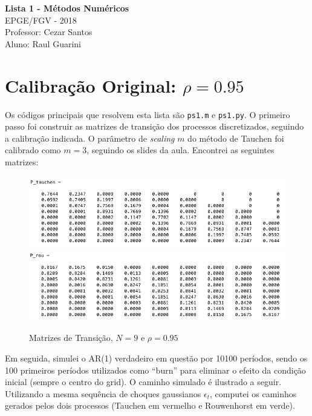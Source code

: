 \documentclass[10pt]{article}
\begin{document}
	\begin{center}
		{\Large{\textbf{Lista 1 - Métodos Numéricos}}}\\
		\vspace{0.2cm}
		EPGE/FGV - 2018\\
		Professor: Cezar Santos\\
		Aluno: Raul Guarini
	\end{center}

\section*{Calibração Original: $\rho = 0.95$}

Os códigos principais que resolvem esta lista são \texttt{ps1.m} e \texttt{ps1.py}. O primeiro passo foi construir as matrizes de transição dos processos discretizados, seguindo a calibração indicada. O parâmetro de \textit{scaling} $m$ do método de Tauchen foi calibrado como $m = 3$, seguindo os slides da aula. Encontrei as seguintes matrizes:
\begin{figure}[h!]
	\centering
	\includegraphics[scale = 0.6]{P_tauchen.png}
	\includegraphics[scale=0.6]{P_row}
	\caption{Matrizes de Transição, $N = 9$ e $\rho = 0.95$}
\end{figure}

Em seguida, simulei o AR(1) verdadeiro em questão por 10100 períodos, sendo os 100 primeiros períodos utilizados como ``burn'' para eliminar o efeito da condição inicial (sempre o centro do grid). O caminho simulado é ilustrado a seguir. Utilizando a mesma sequência de choques gaussianos $\epsilon_{t}$, computei os caminhos gerados pelos dois processos (Tauchen em vermelho e Rouwenhorst em verde).
\end{document}
